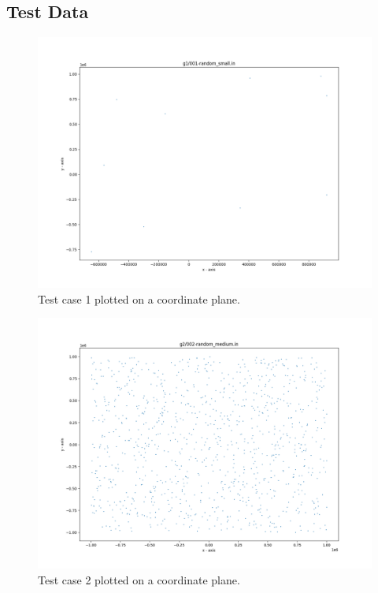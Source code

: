 \documentclass{article}
\begin{document}
\begin{appendices}

\section{Test Data}
\label{appendix:TestData}

\begin{figure}[H]
	\centering
	\includegraphics[scale=0.4]{code/visualizer/testdata/01.png}
	\caption{Test case 1 plotted on a coordinate plane.}
	\label{fig:01}
\end{figure}
\begin{figure}[H]
	\centering
	\includegraphics[scale=0.4]{code/visualizer/testdata/02.png}
	\caption{Test case 2 plotted on a coordinate plane.}

\end{figure}
\end{appendices}
\end{document}
